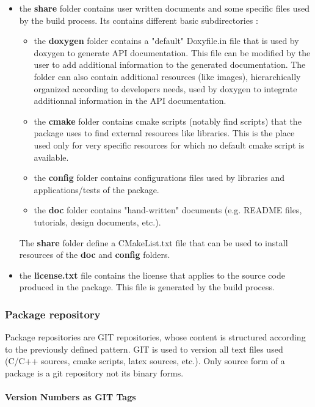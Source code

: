 \documentclass[12pt,a4paper]{article}
\begin{document}
\begin{itemize}
\item the \textbf{share} folder contains user written documents and some specific files used by the build process. Its contains different basic subdirectories :
\begin{itemize}
\item the \textbf{doxygen} folder contains a "default" Doxyfile.in file that is used by doxygen to generate API documentation. This file can be modified by the user to add additional information to the generated documentation. The folder can also contain additional resources (like images), hierarchically organized according to developers needs, used by doxygen to integrate additionnal information in the API documentation.
\item the \textbf{cmake} folder contains cmake scripts (notably find scripts) that the package uses to find external resources like libraries. This is the place used only for very specific resources for which no default cmake script is available.
\item the \textbf{config} folder contains configurations files used by libraries and applications/tests of the package.
\item the \textbf{doc} folder contains "hand-written" documents (e.g. README files, tutorials, design documents, etc.).
\end{itemize}
The \textbf{share} folder define a CMakeList.txt file that can be used to install resources of the \textbf{doc} and \textbf{config} folders.
\item the \textbf{license.txt} file contains the license that applies to the source code produced in the package. This file is generated by the build process.
\end{itemize}

\subsubsection{Package repository}

Package repositories are GIT repositories, whose content is structured according to the previously defined pattern. GIT is used to version all text files used (C/C++ sources, cmake scripts, latex sources, etc.). Only source form of a package is a git repository not its binary forms.

\paragraph{Version Numbers as GIT Tags}
\end{document}
